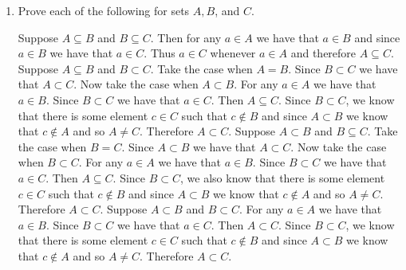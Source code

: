 \documentclass[11pt]{book}
\begin{document}
\begin{enumerate}
\begin{enumerate}
	{Let $a \in \set{x \in \mathbb{Z} \mid \text{for an integer }y,\, x = 6y}$. Then $a = 6b$ for some integer $b$. Then $a = 2 \cdot 3b$. Since $b$ is an integer, $3b$ is also an integer. Therefore $a \in \set{x \in \mathbb{Z} \mid \text{for an integer }y,\, x = 2y}$. Thus $\set{x \in \mathbb{Z} \mid \text{for an integer }y,\, x = 6y} \subseteq \set{x \in \mathbb{Z} \mid \text{for an integer }y,\, x = 2y}$. $\qed$}
	\end{enumerate}
\item Prove each of the following for sets $A, B$, and $C$.
	\begin{enumerate}
	{Suppose $A \subseteq B$ and $B \subseteq C$. Then for any $a \in A$ we have that $a \in B$ and since $a \in B$ we have that $a \in C$. Thus $a \in C$ whenever $a \in A$ and therefore $A \subseteq C$.}
	{Suppose $A \subseteq B$ and $B \subset C$. Take the case when $A = B$. Since $B \subset C$ we have that $A \subset C$. Now take the case when $A \subset B$. For any $a \in A$ we have that $a \in B$. Since $B \subset C$ we have that $a \in C$. Then $A \subseteq C$. Since $B \subset C$, we know that there is some element $c \in C$ such that $c \notin B$ and since $A \subset B$ we know that $c \notin A$ and so $A \neq C$. Therefore $A \subset C$.}
	{Suppose $A \subset B$ and $B \subseteq C$. Take the case when $B = C$. Since $A \subset B$ we have that $A \subset C$. Now take the case when $B \subset C$. For any $a \in A$ we have that $a \in B$. Since $B \subset C$ we have that $a \in C$. Then $A \subseteq C$. Since $B \subset C$, we also know that there is some element $c \in C$ such that $c \notin B$ and since $A \subset B$ we know that $c \notin A$ and so $A \neq C$. Therefore $A \subset C$.}
	{Suppose $A \subset B$ and $B \subset C$. For any $a \in A$ we have that $a \in B$. Since $B \subset C$ we have that $a \in C$. Then $A \subset C$. Since $B \subset C$, we know that there is some element $c \in C$ such that $c \notin B$ and since $A \subset B$ we know that $c \notin A$ and so $A \neq C$. Therefore $A \subset C$.}
	\end{enumerate}

\end{enumerate}
\end{document}
